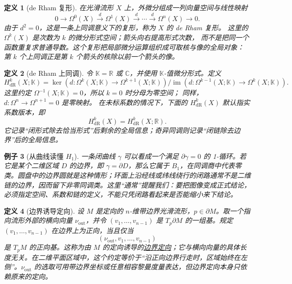 \documentclass[UTF8,fontset=none,a4paper,11pt]{ctexart}
\theoremstyle{foundation-definition}
\newtheorem{definition}{定义}[section]
\theoremstyle{foundation-theorem}
\theoremstyle{foundation-proposition}
\theoremstyle{foundation-example}
\newtheorem{example}[definition]{例子}
\theoremstyle{foundation-remark}
\theoremstyle{foundation-theorem}
\newcommand{\term}[2]{\hyperref[#1]{#2}}
\begin{document}
\begin{definition}[de Rham 复形]\label{def:de-rham-complex}
在光滑流形 \(X\) 上，外微分组成一列向量空间与线性映射
\[
0\longrightarrow\Omega^0(X)
\xrightarrow{d}\Omega^1(X)
\xrightarrow{d}\cdots
\xrightarrow{d}\Omega^n(X)
\longrightarrow0.
\]
由于 \(d^2=0\)，这是一条上同调意义下的复形，称为 \(X\) 的 de Rham 复形。
这里的 \(\Omega^k(X)\) 是次数为 \(k\) 的微分形式空间；箭头向右提高形式次数，
而不是把同一个函数重复求普通导数。这个复形把局部微分运算组织成可取核与像的全局对象：
第 \(k\) 个上同调正是第 \(k\) 个箭头的核除以前一个箭头的像。
\end{definition}

\begin{definition}[de Rham 上同调]\label{def:de-rham-cohomology}
令 \(\mathbb K=\mathbb R\) 或 \(\mathbb C\)，并使用 \(\mathbb K\)-值微分形式。定义
\[
H^k_{\mathrm{dR}}(X;\mathbb K)=
\ker(d:\Omega^k(X;\mathbb K)\to\Omega^{k+1}(X;\mathbb K))
/\operatorname{im}(d:\Omega^{k-1}(X;\mathbb K)\to\Omega^k(X;\mathbb K)).
\]
这里约定 \(\Omega^{-1}(X;\mathbb K)=0\)，所以 \(k=0\) 时分母为零空间；
同样，\(d:\Omega^n\to\Omega^{n+1}=0\) 是零映射。
在未标系数的情况下，下面的 \(H^k_{\mathrm{dR}}(X)\) 默认指实系数版本，即
\[
H^k_{\mathrm{dR}}(X)=H^k_{\mathrm{dR}}(X;\mathbb R).
\]
它记录“闭形式除去恰当形式”后剩余的全局信息；奇异同调则记录“闭链除去边界”后的全局信息。
\end{definition}

\begin{example}[从曲线读懂 \(H_1\)]
一条闭曲线 \(\gamma\) 可以看成一个满足 \(\partial\gamma=0\) 的 1-循环。若它是某个二维区域 \(D\) 的边界，即 \(\gamma=\partial D\)，那么它属于 \(B_1\)，在同调商中代表零类。圆盘中的边界圆就是这种情形；环面上沿经线或纬线绕行的闭路通常不是二维链的边界，因而留下非零同调类。这里“通常”提醒我们：要把图像变成正式结论，必须指定空间、系数和链的定义，不能只凭闭路看起来是否能缩小来下结论。
\end{example}

\begin{definition}[边界诱导定向]\label{def:boundary-orientation}
设 \(M\) 是定向的 \(n\)-维带边界光滑流形，\(p\in\partial M\)。取一个指向流形外部的横向向量 \(\nu_{\mathrm{out}}\)，并令
\((v_1,\ldots,v_{n-1})\) 是 \(T_p\partial M\) 的一组基。规定 \((v_1,\ldots,v_{n-1})\) 在边界上为正向，当且仅当
\[
(\nu_{\mathrm{out}},v_1,\ldots,v_{n-1})
\]
是 \(T_pM\) 的正向基。这称为由 \(M\) 的定向诱导的\term{def:boundary-orientation}{边界定向}；它与横向向量的具体长度无关。在二维平面区域中，这个约定等价于“沿正向边界行走时，区域始终在左侧”。\(\nu_{\mathrm{out}}\) 的选取可用带边界坐标或任意相容黎曼度量表达，但边界定向本身只依赖原来的定向。
\end{definition}
\end{document}
